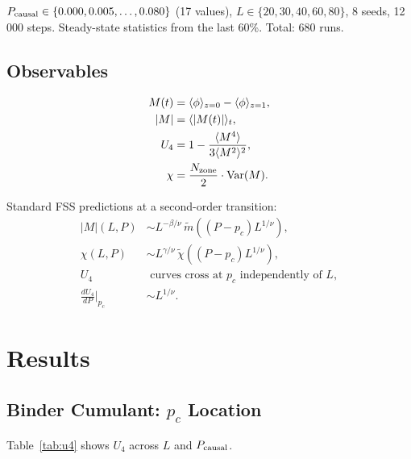 \documentclass[12pt,a4paper]{article}
\begin{document}
$P_{\rm causal} \in \{0.000, 0.005, \ldots, 0.080\}$ (17 values),
$L \in \{20, 30, 40, 60, 80\}$, 8 seeds, 12\,000 steps.
Steady-state statistics from the last 60\%.
Total: 680 runs.

\subsection{Observables}

\begin{align}
M(t)   &= \langle\phi\rangle_{z=0} - \langle\phi\rangle_{z=1}, \\
|M|    &= \langle |M(t)| \rangle_t, \\
U_4    &= 1 - \frac{\langle M^4\rangle}{3\langle M^2\rangle^2}, \\
\chi   &= \frac{N_{\rm zone}}{2} \cdot \mathrm{Var}(M).
\end{align}

Standard FSS predictions at a second-order transition:
\begin{align}
|M|(L, P)   &\sim L^{-\beta/\nu}\, \tilde{m}\!\left((P-p_c)L^{1/\nu}\right), \\
\chi(L, P)  &\sim L^{\gamma/\nu}\, \tilde{\chi}\!\left((P-p_c)L^{1/\nu}\right), \\
U_4         &\text{ curves cross at } p_c \text{ independently of } L, \\
\frac{dU_4}{dP}\bigg|_{p_c} &\sim L^{1/\nu}.
\end{align}

\section{Results}

\subsection{Binder Cumulant: $p_c$ Location}

Table~\ref{tab:u4} shows $U_4$ across $L$ and $P_{\rm causal}$.
\end{document}
